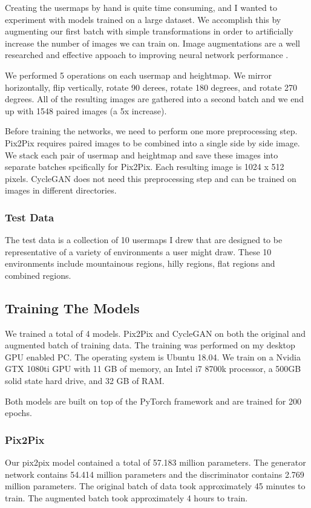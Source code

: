 \documentclass[twocolumn]{article}
\begin{document}
	Creating the usermaps by hand is quite time consuming, and I wanted to experiment with models trained on a large dataset. We accomplish this by augmenting our first batch with simple transformations in order to artificially increase the number of images we can train on. Image augmentations are a well researched and effective appoach to improving neural network performance \cite{perez2017effectiveness}.
	
	We performed 5 operations on each usermap and heightmap. We mirror horizontally, flip vertically, rotate 90 derees, rotate 180 degrees, and rotate 270 degrees.	All of the resulting images are gathered into a second batch and we end up with 1548 paired images (a 5x increase).
	
	Before training the networks, we need to perform one more preprocessing step. Pix2Pix requires paired images to be combined into a single side by side image. We stack each pair of usermap and heightmap and save these images into separate batches spcifically for Pix2Pix. Each resulting image is 1024 x 512 pixels. CycleGAN does not need this preprocessing step and can be trained on images in different directories.
			
	\subsubsection{Test Data}
	
	The test data is a collection of 10 usermaps I drew that are designed to be representative of a variety of environments a user might draw. These 10 environments include mountainous regions, hilly regions, flat regions and combined regions.
	
	\subsection{Training The Models}
	
	We trained a total of 4 models. Pix2Pix and CycleGAN on both the original and augmented batch of training data. The training was performed on my desktop GPU enabled PC. The operating system is Ubuntu 18.04. We train on a Nvidia GTX 1080ti GPU with 11 GB of memory, an Intel i7 8700k processor, a 500GB solid state hard drive, and 32 GB of RAM.
	
	Both models are built on top of the PyTorch framework \cite{paszke2019pytorch} and are trained for 200 epochs.
	
	\subsubsection{Pix2Pix}
		Our pix2pix model contained a total of 57.183 million parameters. The generator network contains 54.414 million parameters and the discriminator contains 2.769 million parameters. The original batch of data took approximately 45 minutes to train. The augmented batch took approximately 4 hours to train.
	
\end{document}
